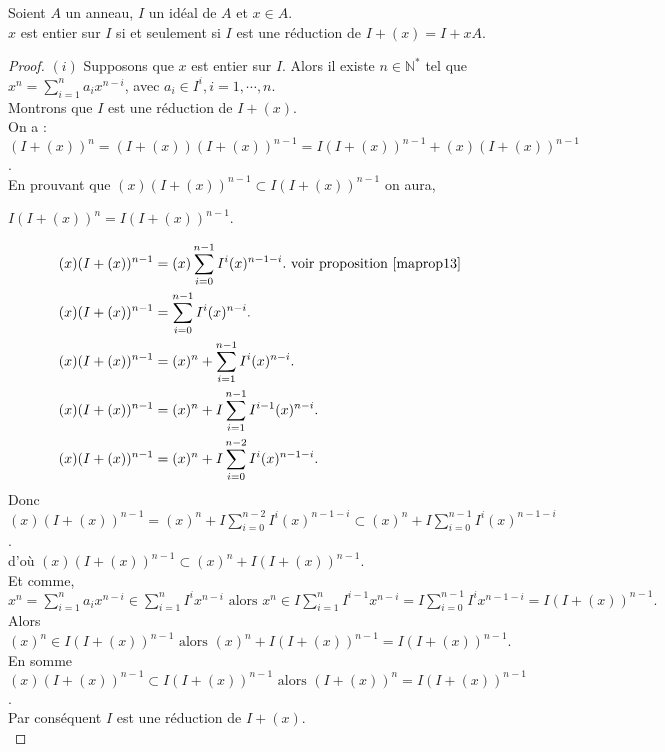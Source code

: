 \begin{maproposition}
	Soient $A$ un anneau, $I$ un idéal de $A$ et $x \in A$.\\
	$x$ est entier sur $I$ si et seulement si $I$ est une réduction de $I + (x) = I +xA $.
\end{maproposition}
\begin{proof}
	$(i)$ Supposons que $x$ est entier sur $I$. Alors il existe $n \in \mathbb{N^*}$ tel que $x^n = \displaystyle \sum_{i=1}^{n}{a_i x^{n-i}}$, avec $a_i \in I^i, i=1, \cdots ,n$.\\
	Montrons que $I$ est une réduction de $I + (x)$.\\
	On a : $(I+(x))^n = (I+(x))(I+(x))^{n-1}= I(I+(x))^{n-1} + (x)(I+(x))^{n-1}$.\\
	En prouvant que $(x)(I+(x))^{n-1} \subset I(I+(x))^{n-1}$ on aura,
	\begin{center}
		$I(I+(x))^{n} = I(I+(x))^{n-1}$.
	\end{center}
	\begin{align*}
		(x)(I+(x))^{n-1} &= (x)\displaystyle \sum_{i=0}^{n-1}{I^i (x)^{n-1-i}}. \text{ voir proposition } \ref{maprop13}\\ 
		(x)(I+(x))^{n-1} &= \displaystyle \sum_{i=0}^{n-1}{I^i (x)^{n-i}}.\\
		(x)(I+(x))^{n-1} &= (x)^n + \displaystyle \sum_{i=1}^{n-1}{I^i (x)^{n-i}}.\\
		(x)(I+(x))^{n-1} &= (x)^n + I\displaystyle \sum_{i=1}^{n-1}{I^{i-1} (x)^{n-i}}.\\
		(x)(I+(x))^{n-1} &= (x)^n + I\displaystyle \sum_{i=0}^{n-2}{I^i (x)^{n-1-i}}.
	\end{align*}
	Donc $(x)(I+(x))^{n-1} = (x)^n + I\displaystyle \sum_{i=0}^{n-2}{I^i (x)^{n-1-i}} \subset (x)^n +I \displaystyle \sum_{i=0}^{n-1}{I^i (x)^{n-1-i}}$.\\
	d'où $(x)(I+(x))^{n-1} \subset (x)^n + I(I+(x))^{n-1}$.\\ Et comme, \\$x^n = \displaystyle \sum_{i=1}^{n}{a_i x^{n-i}} \in \displaystyle \sum_{i=1}^{n}{I^i x^{n-i}} \text{ alors } x^n \in I\displaystyle \sum_{i=1}^{n}{I^{i-1} x^{n-i}} = I\displaystyle \sum_{i=0}^{n-1}{I^i x^{n-1-i}} =I(I+(x))^{n-1}.$\\ Alors $(x)^n \in I(I+(x))^{n-1} \text{ alors } (x)^n + I(I+(x))^{n-1} = I(I+(x))^{n-1}$.\\
	En somme $(x)(I+(x))^{n-1} \subset I(I+(x))^{n-1} \text{ alors } (I+(x))^{n} = I(I+(x))^{n-1}$.\\
	Par conséquent $I$ est une réduction de $I + (x)$.\\

\end{proof}

